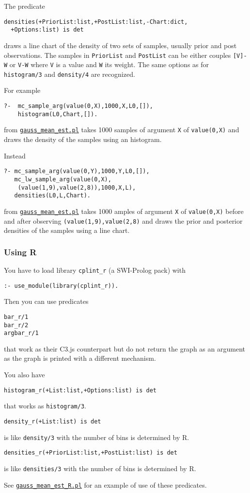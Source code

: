 The predicate
\begin{verbatim}
densities(+PriorList:list,+PostList:list,-Chart:dict,
  +Options:list) is det
\end{verbatim}
draws a line chart of the density of two sets of samples, usually
 prior and post observations. The samples in \verb|PriorList| and \verb|PostList|
can be either couples \verb|[V]-W| or \verb|V-W| where \verb|V| is a value and \verb|W| its weight.
The same options as for \verb|histogram/3| and  \verb|density/4|  are recognized.

For example
\begin{verbatim}
?-  mc_sample_arg(value(0,X),1000,X,L0,[]),
    histogram(L0,Chart,[]).
\end{verbatim}
from \href{http://cplint.eu/example/inference/gauss_mean_est.pl}{\texttt{gauss\_mean\_est.pl}}
takes 1000 samples of argument \verb|X| of \verb|value(0,X)| and draws the density of the samples using an histogram.

Instead
\begin{verbatim}
?- mc_sample_arg(value(0,Y),1000,Y,L0,[]),
   mc_lw_sample_arg(value(0,X),
    (value(1,9),value(2,8)),1000,X,L),
   densities(L0,L,Chart).
\end{verbatim}
from \href{http://cplint.eu/example/inference/gauss_mean_est.pl}{\texttt{gauss\_mean\_est.pl}}
takes 1000 amples of argument \verb|X| of \verb|value(0,X)| before and after observing
\verb|(value(1,9),value(2,8)| and draws the prior and posterior densities of the samples using a line chart.

\subsubsection{Using R}
You have to load library \texttt{cplint\_r}  (a SWI-Prolog pack) with
\begin{verbatim}
:- use_module(library(cplint_r)).
\end{verbatim}
Then you can use predicates
\begin{verbatim}
bar_r/1
bar_r/2
argbar_r/1
\end{verbatim}
that work as their C3.js counterpart but do not return the graph as an argument as the graph is
printed with a different mechanism.

You also have
\begin{verbatim}
histogram_r(+List:list,+Options:list) is det
\end{verbatim}
that works as \texttt{histogram/3}.
\begin{verbatim}
density_r(+List:list) is det
\end{verbatim}
is like \texttt{density/3} with the number of bins  is determined
by R.
\begin{verbatim}
densities_r(+PriorList:list,+PostList:list) is det
\end{verbatim}
is like \texttt{densities/3} with the number of bins  is determined
by R.

See \href{http://cplint.eu/example/inference/gauss_mean_est_R.pl}{\texttt{gauss\_mean\_est\_R.pl}} for an example of use of these predicates.


